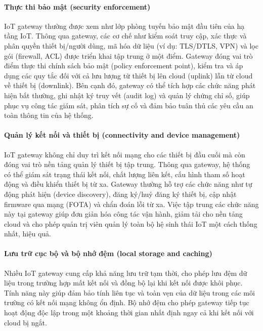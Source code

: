                 \paragraph{Thực thi bảo mật (security enforcement)}
                    IoT gateway thường được xem như lớp phòng tuyến bảo mật đầu tiên của hạ tầng IoT. Thông qua gateway, các cơ chế như kiểm soát truy cập, xác thực và phân quyền thiết bị/người dùng, mã hóa dữ liệu (ví dụ: TLS/DTLS, VPN) và lọc gói (firewall, ACL) được triển khai tập trung ở một điểm. Gateway đóng vai trò điểm thực thi chính sách bảo mật (policy enforcement point), kiểm tra và áp dụng các quy tắc đối với cả lưu lượng từ thiết bị lên cloud (uplink) lẫn từ cloud về thiết bị (downlink). Bên cạnh đó, gateway có thể tích hợp các chức năng phát hiện bất thường, ghi nhật ký truy vết (audit log) và quản lý chứng chỉ số, giúp phục vụ công tác giám sát, phân tích sự cố và đảm bảo tuân thủ các yêu cầu an toàn thông tin của hệ thống.

                \paragraph{Quản lý kết nối và thiết bị (connectivity and device management)}
                    IoT gateway không chỉ duy trì kết nối mạng cho các thiết bị đầu cuối mà còn đóng vai trò nền tảng quản lý thiết bị tập trung. Thông qua gateway, hệ thống có thể giám sát trạng thái kết nối, chất lượng liên kết, cấu hình tham số hoạt động và điều khiển thiết bị từ xa. Gateway thường hỗ trợ các chức năng như tự động phát hiện (device discovery), đăng ký/huỷ đăng ký thiết bị, cập nhật firmware qua mạng (FOTA) và chẩn đoán lỗi từ xa. Việc tập trung các chức năng này tại gateway giúp đơn giản hóa công tác vận hành, giảm tải cho nền tảng cloud và cho phép quản trị viên quản lý toàn bộ hệ sinh thái IoT một cách thống nhất, hiệu quả.

                \paragraph{Lưu trữ cục bộ và bộ nhớ đệm (local storage and caching)}
                    Nhiều IoT gateway cung cấp khả năng lưu trữ tạm thời, cho phép lưu đệm dữ liệu trong trường hợp mất kết nối và đồng bộ lại khi kết nối được khôi phục. Tính năng này giúp đảm bảo tính liên tục và toàn vẹn của dữ liệu trong các môi trường có kết nối mạng không ổn định. Bộ nhớ đệm cho phép gateway tiếp tục hoạt động độc lập trong một khoảng thời gian nhất định ngay cả khi kết nối với cloud bị ngắt.

